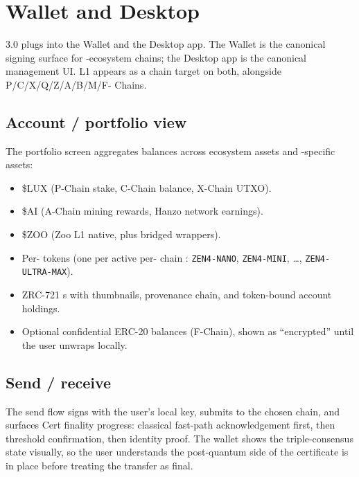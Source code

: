 \section{\Lux{} Wallet and Desktop}
\label{sec:wallet-desktop}

\Zoo{} 3.0 plugs into the \Lux{} Wallet and the \Lux{} Desktop app. The
\Lux{} Wallet is the canonical signing surface for \Lux{}-ecosystem
chains; the \Lux{} Desktop app is the canonical management UI. \Zoo{}
L1 appears as a chain target on both, alongside \Lux{} P/C/X/Q/Z/A/B/M/F-
Chains.

\subsection{Account / portfolio view}

The portfolio screen aggregates balances across \Lux{} ecosystem
assets and \Zoo{}-specific assets:

\begin{itemize}[leftmargin=1.2em]
  \item \$LUX (P-Chain stake, C-Chain balance, X-Chain UTXO).
  \item \$AI (A-Chain mining rewards, Hanzo network earnings).
  \item \$ZOO (Zoo L1 native, plus bridged wrappers).
  \item Per-\LLM{} tokens (one per active per-\LLM{} chain
        \cite{zoo-per-llm-chains}: \texttt{ZEN4-NANO}, \texttt{ZEN4-MINI},
        \dots, \texttt{ZEN4-ULTRA-MAX}).
  \item ZRC-721 \NFT{}s with thumbnails, provenance chain, and
        token-bound account holdings.
  \item Optional confidential ERC-20 balances (F-Chain), shown as
        ``encrypted'' until the user unwraps locally.
\end{itemize}

\subsection{Send / receive}

The send flow signs with the user's local key, submits to the chosen
chain, and surfaces \Quasar{}Cert finality progress: classical
fast-path acknowledgement first, then \Ringtail{} threshold
confirmation, then \MLDSA{} identity proof. The wallet shows the
triple-consensus state visually, so the user understands the
post-quantum side of the certificate is in place before treating
the transfer as final.

